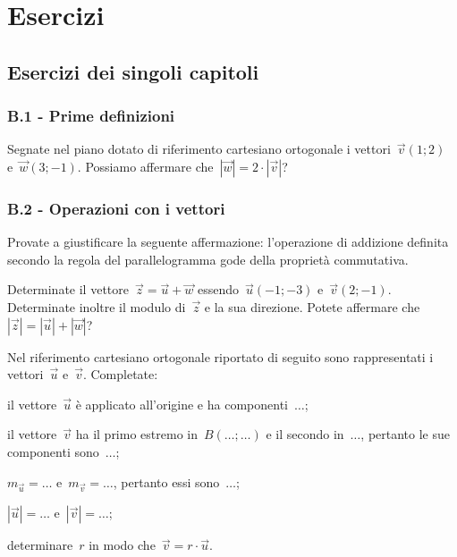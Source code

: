 
\section{Esercizi}

\subsection{Esercizi dei singoli capitoli}

\subsubsection*{B.1 - Prime definizioni}
\begin{esercizio}
\label{ese:B.1}
Segnate nel piano dotato di riferimento cartesiano ortogonale i vettori~$\vec{v}(1;2)$ e~$\vec{w}(3;-1)$. Possiamo affermare che~$|\vec{w}|=2 \cdot |\vec{v}|$?
\end{esercizio}

\subsubsection*{B.2 - Operazioni con i vettori}
\begin{esercizio}
\label{ese:B.2}
Provate a giustificare la seguente affermazione: l'operazione di addizione definita secondo la regola del parallelogramma gode della proprietà commutativa.
\end{esercizio}

\begin{esercizio}
\label{ese:B.3}
Determinate il vettore~$\vec{z}=\vec{u}+\vec{w}$ essendo~$\vec{u}(-1;-3)$ e~$\vec{v}(2;-1)$. Determinate inoltre il modulo di~$\vec{z}$ e la sua direzione.
Potete affermare che~$|\vec{z}|=|\vec{u}|+|\vec{w}|$?
\end{esercizio}

\begin{esercizio}
\label{ese:B.4}
Nel riferimento cartesiano ortogonale riportato di seguito sono rappresentati i vettori~$\vec{u}$ e~$\vec{v}$. Completate:

\begin{enumeratea}
\item il vettore~$\vec{u}$ è applicato all'origine e ha componenti~$\ldots$;
\item il vettore~$\vec{v}$ ha il primo estremo in~$B(\ldots;\ldots)$ e il secondo in~$\ldots$, pertanto le sue componenti sono~$\ldots$;
\item $m_{\vec{u}}=\ldots$ e~$m_{\vec{v}}=\ldots$, pertanto essi sono~$\ldots$;
\item $|\vec{u}|=\ldots$ e~$|\vec{v}|=\ldots$;
\item determinare~$r$ in modo che~$\vec{v}=r \cdot \vec{u}$.
\end{enumeratea}
\begin{center}
 
\end{center}

\end{esercizio}

